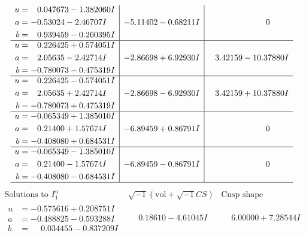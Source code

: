 \documentclass[1p]{elsarticle_modified}
\theoremstyle{definition}
\newcommand{\I}{\sqrt{-1}}
\begin{document}
$$\begin{array}{c|c|c}
\begin{aligned}
u &= \phantom{-}0.047673 - 1.382060 I \\
a &= -0.53024 - 2.46707 I \\
b &= \phantom{-}0.939459 - 0.260395 I\end{aligned}
 & -5.11402 - 0.68211 I & \phantom{-0.000000 } 0 \\ \hline\begin{aligned}
u &= \phantom{-}0.226425 + 0.574051 I \\
a &= \phantom{-}2.05635 - 2.42714 I \\
b &= -0.780073 - 0.475319 I\end{aligned}
 & -2.86698 + 6.92930 I & \phantom{-}3.42159 - 10.37880 I \\ \hline\begin{aligned}
u &= \phantom{-}0.226425 - 0.574051 I \\
a &= \phantom{-}2.05635 + 2.42714 I \\
b &= -0.780073 + 0.475319 I\end{aligned}
 & -2.86698 - 6.92930 I & \phantom{-}3.42159 + 10.37880 I \\ \hline\begin{aligned}
u &= -0.065349 + 1.385010 I \\
a &= \phantom{-}0.21400 + 1.57674 I \\
b &= -0.408080 + 0.684531 I\end{aligned}
 & -6.89459 + 0.86791 I & \phantom{-0.000000 } 0 \\ \hline\begin{aligned}
u &= -0.065349 - 1.385010 I \\
a &= \phantom{-}0.21400 - 1.57674 I \\
b &= -0.408080 - 0.684531 I\end{aligned}
 & -6.89459 - 0.86791 I & \phantom{-0.000000 } 0\\
 \hline 
 \end{array}$$\newpage$$\begin{array}{c|c|c}  
\text{Solutions to }I^u_{1}& \I (\text{vol} + \sqrt{-1}CS) & \text{Cusp shape}\\
 \hline 
\begin{aligned}
u &= -0.575616 + 0.208751 I \\
a &= -0.488825 - 0.593288 I \\
b &= \phantom{-}0.034455 - 0.837209 I\end{aligned}
 & \phantom{-}0.18610 - 4.61045 I & \phantom{-}6.00000 + 7.28544 I \\ \hline\begin{aligned}

\end{aligned}
\end{array}$$
\end{document}
